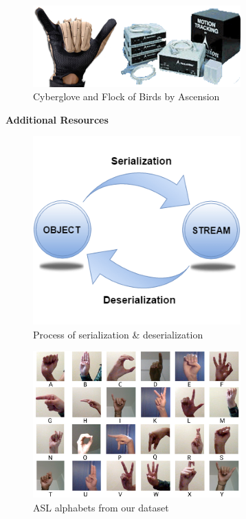 \documentclass[twocolumn]{article}
\begin{document}
\begin{figure}[h]
\centering
\includegraphics[width=8cm]{./figures/cyberglove and flock of birds}
\caption{Cyberglove and Flock of Birds by Ascension}
\end{figure}




\listoffigures
\listoftables

\glsaddall
\setlength{\glsdescwidth}{0.8\textwidth}
\printglossary[type=\acronymtype,title=List Of Abbreviations]

\clearpage
\LARGE{\textbf{Additional Resources}}

\begin{figure}[h]
\centering
\includegraphics[width=8cm]{./figures/serialization and deserialization}
\caption{Process of serialization \& deserialization}
\end{figure}

\begin{figure}[h]
\centering
\includegraphics[width=8cm]{./figures/alphabets}
\caption{ASL alphabets from our dataset}
\end{figure}
\end{document}
